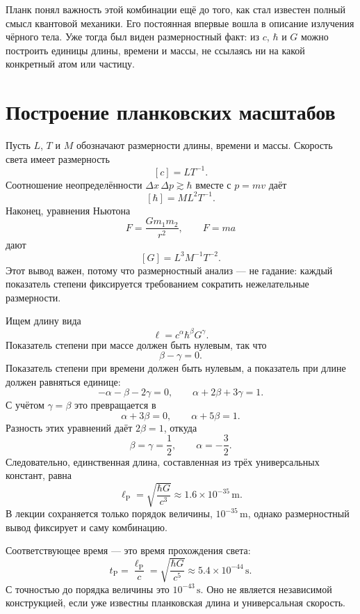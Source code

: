 Планк понял важность этой комбинации ещё до того, как стал известен полный смысл квантовой механики. Его постоянная впервые вошла в описание излучения чёрного тела. Уже тогда был виден размерностный факт: из \(c\), \(\hbar\) и \(G\) можно построить единицы длины, времени и массы, не ссылаясь ни на какой конкретный атом или частицу.

\section{Построение планковских масштабов}

Пусть \(L\), \(T\) и \(M\) обозначают размерности длины, времени и массы. Скорость света имеет размерность
\[
[c]=LT^{-1}.
\]
Соотношение неопределённости \(\Delta x\,\Delta p\gtrsim\hbar\) вместе с \(p=mv\) даёт
\[
[\hbar]=ML^2T^{-1}.
\]
Наконец, уравнения Ньютона
\[
F=\frac{Gm_1m_2}{r^2},
\qquad
F=ma
\]
дают
\[
[G]=L^3M^{-1}T^{-2}.
\]
Этот вывод важен, потому что размерностный анализ — не гадание: каждый показатель степени фиксируется требованием сократить нежелательные размерности.

Ищем длину вида
\begin{equation}
\ell=c^\alpha\hbar^\beta G^\gamma.
\label{eq:c10-length-ansatz}
\end{equation}
Показатель степени при массе должен быть нулевым, так что
\[
\beta-\gamma=0.
\]
Показатель степени при времени должен быть нулевым, а показатель при длине должен равняться единице:
\[
-\alpha-\beta-2\gamma=0,
\qquad
\alpha+2\beta+3\gamma=1.
\]
С учётом \(\gamma=\beta\) это превращается в
\[
\alpha+3\beta=0,
\qquad
\alpha+5\beta=1.
\]
Разность этих уравнений даёт \(2\beta=1\), откуда
\[
\beta=\gamma=\frac12,
\qquad
\alpha=-\frac32.
\]
Следовательно, единственная длина, составленная из трёх универсальных констант, равна
\begin{equation}
\ell_{\mathrm P}
=\sqrt{\frac{\hbar G}{c^3}}
\approx 1.6\times10^{-35}\,\mathrm m.
\label{eq:c10-planck-length}
\end{equation}
В лекции сохраняется только порядок величины, \(10^{-35}\,\mathrm m\), однако размерностный вывод фиксирует и саму комбинацию.

Соответствующее время — это время прохождения света:
\begin{equation}
t_{\mathrm P}
=\frac{\ell_{\mathrm P}}{c}
=\sqrt{\frac{\hbar G}{c^5}}
\approx 5.4\times10^{-44}\,\mathrm s.
\label{eq:c10-planck-time}
\end{equation}
С точностью до порядка величины это \(10^{-43}\,\mathrm s\). Оно не является независимой конструкцией, если уже известны планковская длина и универсальная скорость.

